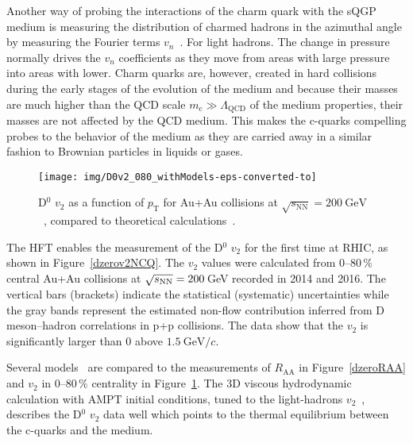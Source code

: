 Another way of probing the interactions of the charm quark with the sQGP medium is measuring the distribution of charmed hadrons in the azimuthal angle by measuring the Fourier terms $v_n$~\cite{StrangeAndChargedv2paper}\@. 
For light hadrons. The change in pressure normally drives the $v_n$ coefficients as they move from areas with large pressure into areas with lower. Charm quarks are, however, created in hard collisions during the early stages of the evolution of the medium and because their masses are much higher than the QCD scale $m_\mathrm{c} \gg \Lambda_\text{QCD}$ of the medium properties, their masses are not affected by the QCD medium. This makes the c-quarks compelling probes to the behavior of the medium as they are carried away in a similar fashion to Brownian particles in liquids or gases. 

\begin{figure}[!htb]
\begin{center}
 \texttt{[image: img/D0v2\_080\_withModels-eps-converted-to]}\\
\end{center}
\caption[D$^0$ $v_2$ as a function of $p_\mathrm{T}$.]{\label{dzerov2}D$^0$ $v_2$ as a function of $p_\mathrm{T}$ for Au+Au collisions
at $\sqrt{s_\mathrm{NN}} = \SI{200}{\giga\electronvolt}$~\cite{D0v2paper}, compared to theoretical calculations~\cite{PHSD2014,LBT,LBTprivate,TAMU,PHSD2015,SUBATECHvn,SUBATECHquenching,Duke,Duke2015,Hydro2012,Hydro2015}.}
\end{figure}


The HFT enables the measurement of the D$^0$ $v_2$ for the first 
time at RHIC, as shown in Figure~\ref{dzerov2NCQ}\@. The $v_2$ values were calculated from 0--80$\,\%$ central Au+Au collisions at $\sqrt{s_\text{NN}} = 200\,$GeV recorded in 2014 and 2016. The vertical bars (brackets) indicate 
the statistical (systematic)
uncertainties while the gray bands represent the estimated non-flow contribution inferred
from D meson--hadron correlations in p+p collisions. The data show that the $v_2$
is significantly larger than 0 above $\SI{1.5}{\giga\electronvolt}/c$\@.

Several models~\cite{Hydro2012,Hydro2015,PHSD2014,LBT,LBTprivate,TAMU,PHSD2015,SUBATECHvn,SUBATECHquenching,Duke,Duke2015} are compared to the
measurements of $R_\mathrm{AA}$ in Figure~\ref{dzeroRAA} and $v_2$ in 0--80$\,\%$ centrality 
in Figure~\ref{dzerov2}\@. The 3D viscous hydrodynamic calculation with AMPT 
initial conditions, tuned to the light-hadrons $v_2$~\cite{Hydro2012,Hydro2015}, describes the D$^0$ $v_2$ data well 
which points to the thermal equilibrium between the c-quarks and the medium.

